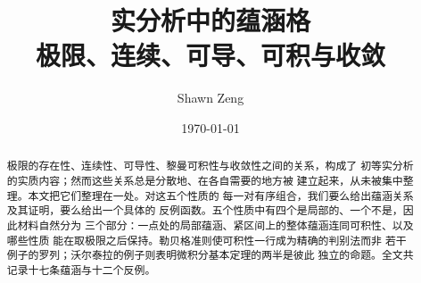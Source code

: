 \documentclass[11pt,UTF8]{ctexart}
\title{\bfseries 实分析中的蕴涵格\\[2pt]
  \large 极限、连续、可导、可积与收敛}
\author{Shawn Zeng}
\date{\today}
\begin{document}
\maketitle

\begin{abstract}
\noindent
极限的存在性、连续性、可导性、黎曼可积性与收敛性之间的关系，构成了
初等实分析的实质内容；然而这些关系总是分散地、在各自需要的地方被
建立起来，从未被集中整理。本文把它们整理在一处。对这五个性质的
每一对有序组合，我们要么给出蕴涵关系及其证明，要么给出一个具体的
反例函数。五个性质中有四个是局部的、一个不是，因此材料自然分为
三个部分：一点处的局部蕴涵、紧区间上的整体蕴涵连同可积性、以及哪些性质
能在取极限之后保持。勒贝格准则使可积性一行成为精确的判别法而非
若干例子的罗列；沃尔泰拉的例子则表明微积分基本定理的两半是彼此
独立的命题。全文共记录十七条蕴涵与十二个反例。
\end{abstract}







\end{document}
